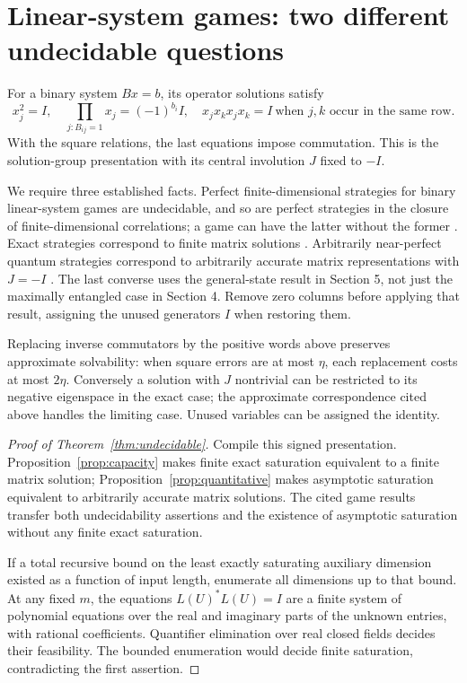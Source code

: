 \documentclass[11pt]{article}
\begin{document}
\section{Linear-system games: two different undecidable questions}
For a binary system $Bx=b$, its operator solutions satisfy
\[
 x_j^2=I,\quad
 \prod_{j:B_{ij}=1}x_j=(-1)^{b_i}I,\quad
 x_jx_kx_jx_k=I
 \ \text{when $j,k$ occur in the same row}.
\]
With the square relations, the last equations impose commutation. This is the solution-group presentation with its central involution $J$ fixed to $-I$.

We require three established facts. Perfect finite-dimensional strategies for binary linear-system games are undecidable, and so are perfect strategies in the closure of finite-dimensional correlations; a game can have the latter without the former \cite[Theorems 1.1--1.2 and Corollary 1.4]{slofstra}. Exact strategies correspond to finite matrix solutions \cite[Theorem 3.2]{slofstra}. Arbitrarily near-perfect quantum strategies correspond to arbitrarily accurate matrix representations with $J=-I$ \cite[Theorem 5.1, Corollaries 5.2--5.3 and Proposition 2.7]{sv}. The last converse uses the general-state result in Section 5, not just the maximally entangled case in Section 4. Remove zero columns before applying that result, assigning the unused generators $I$ when restoring them.

Replacing inverse commutators by the positive words above preserves approximate solvability: when square errors are at most $\eta$, each replacement costs at most $2\eta$. Conversely a solution with $J$ nontrivial can be restricted to its negative eigenspace in the exact case; the approximate correspondence cited above handles the limiting case. Unused variables can be assigned the identity.

\begin{proof}[Proof of Theorem~\ref{thm:undecidable}]
Compile this signed presentation. Proposition~\ref{prop:capacity} makes finite exact saturation equivalent to a finite matrix solution; Proposition~\ref{prop:quantitative} makes asymptotic saturation equivalent to arbitrarily accurate matrix solutions. The cited game results transfer both undecidability assertions and the existence of asymptotic saturation without any finite exact saturation.

If a total recursive bound on the least exactly saturating auxiliary dimension existed as a function of input length, enumerate all dimensions up to that bound. At any fixed $m$, the equations $L(U)^*L(U)=I$ are a finite system of polynomial equations over the real and imaginary parts of the unknown entries, with rational coefficients. Quantifier elimination over real closed fields decides their feasibility. The bounded enumeration would decide finite saturation, contradicting the first assertion.
\end{proof}
\end{document}
